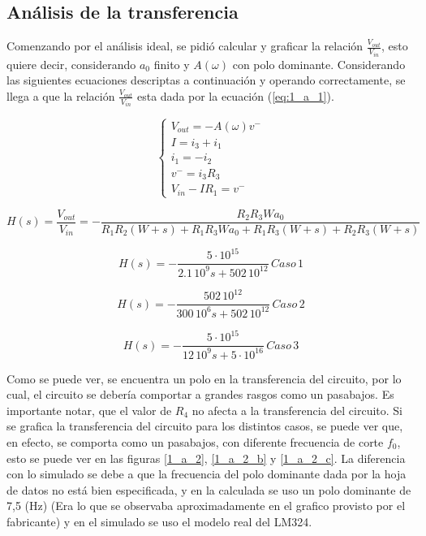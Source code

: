 \subsection{Análisis de la transferencia\label{subsec:1_a_1}}

Comenzando por el análisis ideal, se pidió calcular y graficar la
relación $\frac{V_{out}}{V_{in}}$, esto quiere decir, considerando
$a_{0}$ finito y $A(\omega)$ con polo dominante. Considerando las
siguientes ecuaciones descriptas a continuación y operando correctamente,
se llega a que la relación $\frac{V_{out}}{V_{in}}$ esta dada por
la ecuación (\ref{eq:1_a_1}).

\[
\left\{ \begin{array}{c}
V_{out}=-A(\omega)v^{-}\\
I=i_{3}+i_{1}\\
i_{1}=-i_{2}\\
v^{-}=i_{3}R_{3}\\
V_{in}-IR_{1}=v^{-}
\end{array}\right.
\]

\begin{equation}
H(s)=\frac{V_{out}}{V_{in}}=-\frac{R_{2}R_{3}Wa_{0}}{R_{1}R_{2}\left(W+s\right)+R_{1}R_{3}Wa_{0}+R_{1}R_{3}\left(W+s\right)+R_{2}R_{3}\left(W+s\right)}\label{eq:1_a_1}
\end{equation}

\[
H(s)=-\frac{5\cdot10^{15}}{2.1\,10^{9}s+502\,10^{12}}\,Caso\,1
\]

\[
H(s)=-\frac{502\,10^{12}}{300\,10^{6}s+502\,10^{12}}\,Caso\,2
\]

\[
H(s)=-\frac{5\cdot10^{15}}{12\,10^{9}s+5\cdot10^{16}}\,Caso\,3
\]

Como se puede ver, se encuentra un polo en la transferencia del circuito,
por lo cual, el circuito se debería comportar a grandes rasgos como
un pasabajos. Es importante notar, que el valor de $R_{4}$ no afecta
a la transferencia del circuito. Si se grafica la transferencia del
circuito para los distintos casos, se puede ver que, en efecto, se
comporta como un pasabajos, con diferente frecuencia de corte $f_{0}$,
esto se puede ver en las figuras \ref{1_a_2}, \ref{1_a_2_b} y \ref{1_a_2_c}.
La diferencia con lo simulado se debe a que la frecuencia del polo
dominante dada por la hoja de datos no está bien especificada, y en
la calculada se uso un polo dominante de 7,5 (Hz) (Era lo que se observaba
aproximadamente en el grafico provisto por el fabricante) y en el
simulado se uso el modelo real del LM324.

